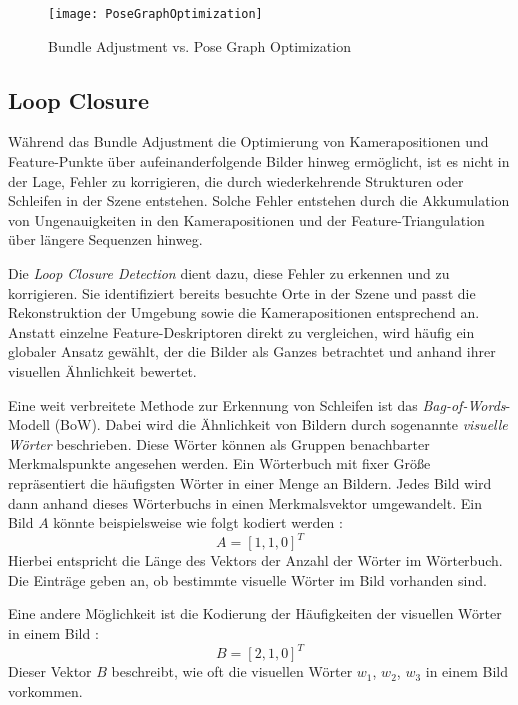 \begin{figure}
    \centering
    \texttt{[image: PoseGraphOptimization]}
    \caption{Bundle Adjustment vs. Pose Graph Optimization \cite{gao2021vSLAM}\label{fig:PoseGraph}}\par
\end{figure}

\subsection{Loop Closure}

Während das Bundle Adjustment die Optimierung von Kamerapositionen und Feature-Punkte über aufeinanderfolgende Bilder hinweg ermöglicht, ist es nicht in der Lage, Fehler zu korrigieren, die durch wiederkehrende Strukturen oder Schleifen in der Szene entstehen. Solche Fehler entstehen durch die Akkumulation von Ungenauigkeiten in den Kamerapositionen und der Feature-Triangulation über längere Sequenzen hinweg. \cite{gao2021vSLAM, cadena2016slam}

Die \textit{Loop Closure Detection} dient dazu, diese Fehler zu erkennen und zu korrigieren. Sie identifiziert bereits besuchte Orte in der Szene und passt die Rekonstruktion der Umgebung sowie die Kamerapositionen entsprechend an. Anstatt einzelne Feature-Deskriptoren direkt zu vergleichen, wird häufig ein globaler Ansatz gewählt, der die Bilder als Ganzes betrachtet und anhand ihrer visuellen Ähnlichkeit bewertet. \cite{gao2021vSLAM, cadena2016slam}

Eine weit verbreitete Methode zur Erkennung von Schleifen ist das \emph{Bag-of-Words}-Modell (BoW). Dabei wird die Ähnlichkeit von Bildern durch sogenannte \emph{visuelle Wörter} beschrieben. Diese Wörter können als Gruppen benachbarter Merkmalspunkte angesehen werden. Ein Wörterbuch mit fixer Größe repräsentiert die häufigsten Wörter in einer Menge an Bildern. Jedes Bild wird dann anhand dieses Wörterbuchs in einen Merkmalsvektor umgewandelt. Ein Bild \( A \) könnte beispielsweise wie folgt kodiert werden \cite{gao2021vSLAM, yoon2024BoW}: 
\begin{equation}
    A = [1, 1, 0]^T
\end{equation}
Hierbei entspricht die Länge des Vektors der Anzahl der Wörter im Wörterbuch. Die Einträge geben an, ob bestimmte visuelle Wörter im Bild vorhanden sind. 

Eine andere Möglichkeit ist die Kodierung der Häufigkeiten der visuellen Wörter in einem Bild \cite{gao2021vSLAM}:
\begin{equation}
    B = [2, 1, 0]^T
\end{equation}
Dieser Vektor \( B \) beschreibt, wie oft die visuellen Wörter \( w_1 \), \( w_2 \), \( w_3 \) in einem Bild vorkommen. 


